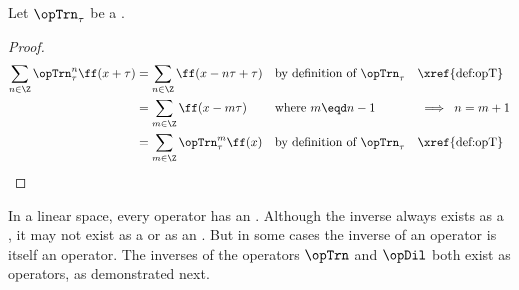 \begin{proposition}
\label{prop:opT_periodic}
Let $\opTrn_\tau$ be a  .
\end{proposition}
\begin{proof}
\begin{align*}
  \sum_{n\in\Z}\opTrn_\tau^n\ff(x+\tau)
    &= \sum_{n\in\Z}\ff(x-n\tau+\tau)
    && \text{by definition of $\opTrn_\tau$} && \text{\xref{def:opT}}
  \\&= \sum_{m\in\Z}\ff(x-m\tau)
    && \text{where $m\eqd n-1$}         && \implies\;n=m+1
  \\&= \sum_{m\in\Z}\opTrn_\tau^m\ff(x)
    && \text{by definition of $\opTrn_\tau$} && \text{\xref{def:opT}}
\end{align*}
\end{proof}

In a linear space, every operator has an .
Although the inverse always exists as a ,
it may not exist as a or as an .
But in some cases the inverse of an operator is itself an operator.
The inverses of the operators $\opTrn$ and $\opDil$ both exist as operators,
as demonstrated next.


